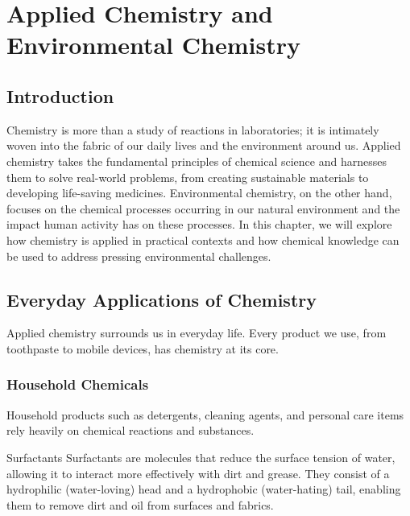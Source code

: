 \chapter{Applied Chemistry and Environmental Chemistry}

\section{Introduction}

Chemistry is more than a study of reactions in laboratories; it is intimately woven into the fabric of our daily lives and the environment around us. Applied chemistry takes the fundamental principles of chemical science and harnesses them to solve real-world problems, from creating sustainable materials to developing life-saving medicines. Environmental chemistry, on the other hand, focuses on the chemical processes occurring in our natural environment and the impact human activity has on these processes. In this chapter, we will explore how chemistry is applied in practical contexts and how chemical knowledge can be used to address pressing environmental challenges.

\section{Everyday Applications of Chemistry}

Applied chemistry surrounds us in everyday life. Every product we use, from toothpaste to mobile devices, has chemistry at its core.

\subsection{Household Chemicals}

Household products such as detergents, cleaning agents, and personal care items rely heavily on chemical reactions and substances.

\begin{keyconcept}{Surfactants}
Surfactants are molecules that reduce the surface tension of water, allowing it to interact more effectively with dirt and grease. They consist of a hydrophilic (water-loving) head and a hydrophobic (water-hating) tail, enabling them to remove dirt and oil from surfaces and fabrics.
\end{keyconcept}


